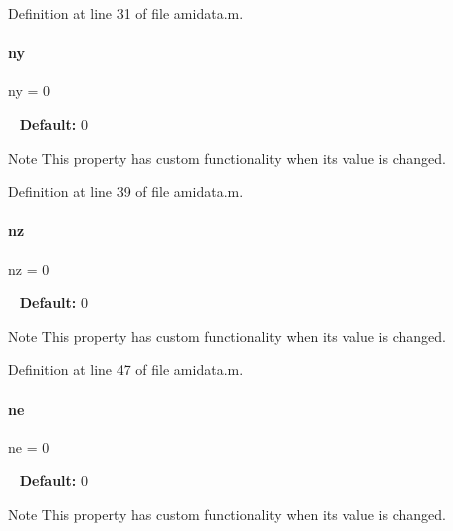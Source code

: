 Definition at line 31 of file amidata.\+m.

\mbox{\label{classamidata_a289ca425eb368f1d582b6be2be0d3dfc}} 
\paragraph{\texorpdfstring{ny}{ny}}
{\footnotesize\ttfamily ny = 0}

~\newline
{\bfseries Default\+:} 0

\begin{DoxyNote}{Note}
This property has custom functionality when its value is changed. 
\end{DoxyNote}


Definition at line 39 of file amidata.\+m.

\mbox{\label{classamidata_a79f11413e5bfe18a0e71e17574399ad5}} 
\paragraph{\texorpdfstring{nz}{nz}}
{\footnotesize\ttfamily nz = 0}

~\newline
{\bfseries Default\+:} 0

\begin{DoxyNote}{Note}
This property has custom functionality when its value is changed. 
\end{DoxyNote}


Definition at line 47 of file amidata.\+m.

\mbox{\label{classamidata_aaca25d624cf863f786f67137c62aa11d}} 
\paragraph{\texorpdfstring{ne}{ne}}
{\footnotesize\ttfamily ne = 0}

~\newline
{\bfseries Default\+:} 0

\begin{DoxyNote}{Note}
This property has custom functionality when its value is changed. 
\end{DoxyNote}


